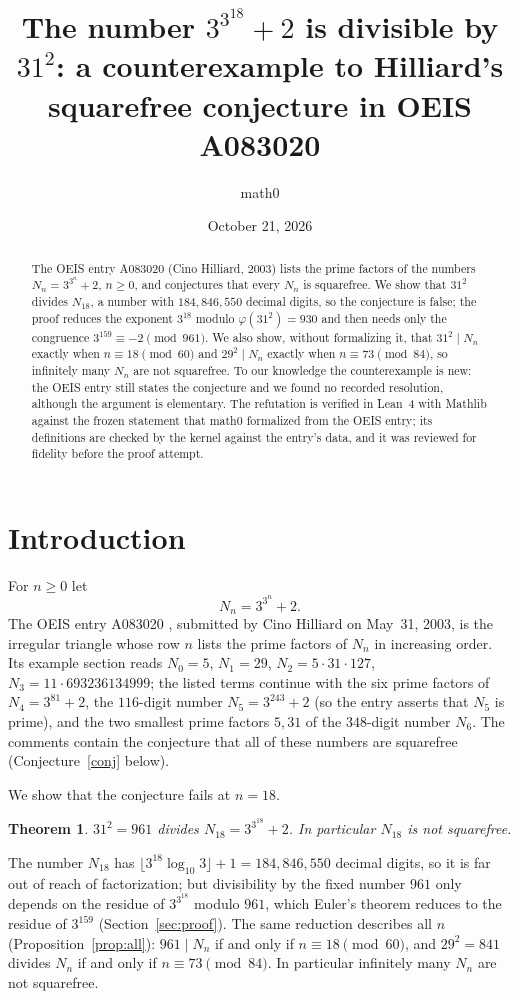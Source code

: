 \documentclass[11pt]{amsart}
\title[A counterexample to the squarefree conjecture in OEIS A083020]{The number $3^{3^{18}}+2$ is divisible by $31^2$: a counterexample to Hilliard's squarefree conjecture in OEIS A083020}
\author{math0}
\date{October 21, 2026}
\theoremstyle{plain}
\newtheorem{theorem}{Theorem}
\theoremstyle{definition}
\begin{document}
\begin{abstract}
The OEIS entry A083020 (Cino Hilliard, 2003) lists the prime factors of the numbers $N_n=3^{3^n}+2$, $n\ge0$, and conjectures that every $N_n$ is squarefree.
We show that $31^2$ divides $N_{18}$, a number with $184{,}846{,}550$ decimal digits, so the conjecture is false; the proof reduces the exponent $3^{18}$ modulo $\varphi(31^2)=930$ and then needs only the congruence $3^{159}\equiv-2\pmod{961}$.
We also show, without formalizing it, that $31^2\mid N_n$ exactly when $n\equiv18\pmod{60}$ and $29^2\mid N_n$ exactly when $n\equiv73\pmod{84}$, so infinitely many $N_n$ are not squarefree.
To our knowledge the counterexample is new: the OEIS entry still states the conjecture and we found no recorded resolution, although the argument is elementary.
The refutation is verified in Lean~4 with Mathlib against the frozen statement that math0 formalized from the OEIS entry; its definitions are checked by the kernel against the entry's data, and it was reviewed for fidelity before the proof attempt.
\end{abstract}
\maketitle

\section{Introduction}

For $n\ge0$ let
\[
  N_n = 3^{3^n}+2 .
\]
The OEIS entry A083020 \cite{A083020}, submitted by Cino Hilliard on May~31, 2003, is the irregular triangle whose row $n$ lists the prime factors of $N_n$ in increasing order.
Its example section reads $N_0=5$, $N_1=29$, $N_2=5\cdot31\cdot127$, $N_3=11\cdot693236134999$; the listed terms continue with the six prime factors of $N_4=3^{81}+2$, the $116$-digit number $N_5=3^{243}+2$ (so the entry asserts that $N_5$ is prime), and the two smallest prime factors $5,31$ of the $348$-digit number $N_6$.
The comments contain the conjecture that all of these numbers are squarefree (Conjecture~\ref{conj} below).

We show that the conjecture fails at $n=18$.

\begin{theorem}\label{thm:main}
$31^2=961$ divides $N_{18}=3^{3^{18}}+2$. In particular $N_{18}$ is not squarefree.
\end{theorem}

The number $N_{18}$ has $\lfloor 3^{18}\log_{10}3\rfloor+1=184{,}846{,}550$ decimal digits, so it is far out of reach of factorization; but divisibility by the fixed number $961$ only depends on the residue of $3^{3^{18}}$ modulo $961$, which Euler's theorem reduces to the residue of $3^{159}$ (Section~\ref{sec:proof}).
The same reduction describes all $n$ (Proposition~\ref{prop:all}): $961\mid N_n$ if and only if $n\equiv18\pmod{60}$, and $29^2=841$ divides $N_n$ if and only if $n\equiv73\pmod{84}$.
In particular infinitely many $N_n$ are not squarefree.
\end{document}
